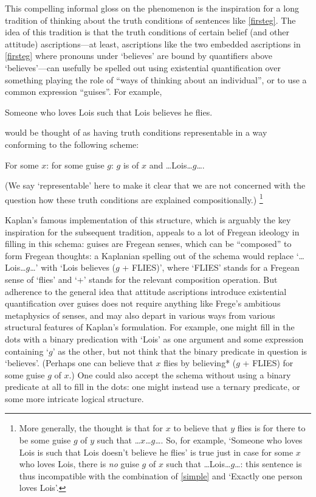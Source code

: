 \documentclass[If.tex]{subfiles}
\begin{document}
This compelling informal gloss on the phenomenon is the inspiration for a long tradition of thinking about the truth conditions of sentences like \ref{firsteg}.  The idea of this tradition is that the truth conditions of certain belief (and other attitude) ascriptions---at least, ascriptions like the two embedded ascriptions in \ref{firsteg} where pronouns under ‘believes’ are bound by quantifiers above ‘believes’---can usefully be spelled out using existential quantification over something playing the role of “ways of thinking about an individual”, or to use a common expression “guises”.  For example, 
\begin{prop}
    \nitem \label{simple}
    Someone who loves Lois such that Lois believes he flies.
\end{prop}
would be thought of as having truth conditions representable in a way conforming to the following scheme:
\begin{prop}
    \nitem
    For some $x$: for some guise $g$: $g$ is of $x$ and …Lois…$g$….
\end{prop}
(We say ‘representable’ here to make it clear that we are not concerned with the question how these truth conditions are explained compositionally.)%
\footnote{More generally, the thought is that for $x$ to believe that $y$ flies is for there to be some guise $g$ of $y$ such that …$x$…$g$…. So, for example, ‘Someone who loves Lois is such that Lois doesn't believe he flies’ is true just in case for some $x$ who loves Lois, there is \emph{no} guise $g$ of $x$ such that …Lois…$g$…: this sentence is thus incompatible with the combination of \ref{simple} and ‘Exactly one person loves Lois’.}

Kaplan's famous implementation of this structure, which is arguably the key inspiration for the subsequent tradition, appeals to a lot of Fregean ideology in filling in this schema: guises are Fregean senses, which can be “composed” to form Fregean thoughts: a Kaplanian spelling out of the schema would replace  ‘…Lois…$g$…’ with ‘Lois believes ($g$ + FLIES)’, where ‘FLIES’ stands for a Fregean sense of ‘flies’ and ‘+’ stands for the relevant composition operation.  But adherence to the general idea that attitude ascriptions introduce existential quantification over guises does not require anything like Frege's ambitious metaphysics of senses, and may also depart in various ways from various structural features of Kaplan's formulation.  For example, one might fill in the dots with a binary predication with ‘Lois’ as one argument and some expression containing ‘$g$’ as the other, but not think that the binary predicate in question is ‘believes’.  (Perhaps one can believe that $x$ flies by believing* ($g$ + FLIES) for some guise $g$ of $x$.)  One could also accept the schema without using a binary predicate at all to fill in the dots: one might instead use a ternary predicate, or some more intricate logical structure.
\end{document}
